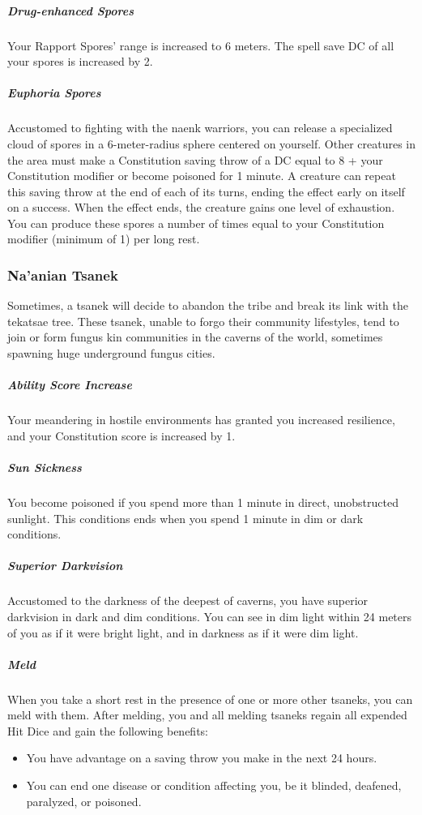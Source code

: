     \subparagraph{Drug-enhanced Spores} Your Rapport Spores' range is increased to 6 meters.
    The spell save DC of all your spores is increased by 2.

    \subparagraph{Euphoria Spores} Accustomed to fighting with the naenk warriors, you can release a specialized cloud of spores in a 6-meter-radius sphere centered on yourself.
    Other creatures in the area must make a Constitution saving throw of a DC equal to 8 + your Constitution modifier or become poisoned for 1 minute.
    A creature can repeat this saving throw at the end of each of its turns, ending the effect early on itself on a success.
    When the effect ends, the creature gains one level of exhaustion.
    You can produce these spores a number of times equal to your Constitution modifier (minimum of 1) per long rest.

\subsubsection{Na'anian Tsanek}
    Sometimes, a tsanek will decide to abandon the tribe and break its link with the tekatsae tree.
    These tsanek, unable to forgo their community lifestyles, tend to join or form fungus kin communities in the caverns of the world, sometimes spawning huge underground fungus cities.

    \subparagraph{Ability Score Increase} Your meandering in hostile environments has granted you increased resilience, and your Constitution score is increased by 1.

    \subparagraph{Sun Sickness} You become poisoned if you spend more than 1 minute in direct, unobstructed sunlight.
    This conditions ends when you spend 1 minute in dim or dark conditions.

    \subparagraph{Superior Darkvision} Accustomed to the darkness of the deepest of caverns, you have superior darkvision in dark and dim conditions.
    You can see in dim light within 24 meters of you as if it were bright light, and in darkness as if it were dim light.

    \subparagraph{Meld} \label{kin::tsanek.meld}
    When you take a short rest in the presence of one or more other tsaneks, you can meld with them.
    After melding, you and all melding tsaneks regain all expended Hit Dice and gain the following benefits:
    \begin{itemize}
        \item You have advantage on a saving throw you make in the next 24 hours.
        \item You can end one disease or condition affecting you, be it blinded, deafened, paralyzed, or poisoned.
    \end{itemize}

